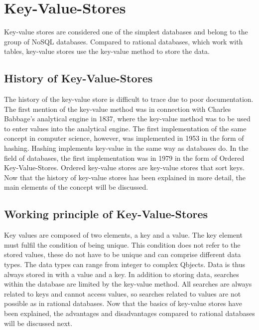 
\section{Key-Value-Stores}

Key-value stores are considered one of the simplest databases and belong to the group of NoSQL databases. 
Compared to rational databases, which work with tables, key-value stores use the key-value method to store the data. \parencite{Key_Value_Datastore_Hazelcast}


\subsection{History of Key-Value-Stores}

The history of the key-value store is difficult to trace due to poor documentation. 
The first mention of the key-value method was in connection with Charles Babbage's analytical engine in 1837, where the key-value method was to be used to enter values into the analytical engine. 
The first implementation of the same concept in computer science, however, was implemented in 1953 in the form of hashing. 
Hashing implements key-value in the same way as databases do. 
In the field of databases, the first implementation was in 1979 in the form of Ordered Key-Value-Stores. 
Ordered key-value stores are key-value stores that sort keys. 
Now that the history of key-value stores has been explained in more detail, the main elements of the concept will be discussed.\parencite{babge_table_cards, hash_table_history, ordered_key_value_history}

\subsection{Working principle of Key-Value-Stores}

Key values are composed of two elements, a key and a value. 
The key element must fulfil the condition of being unique. 
This condition does not refer to the stored values, these do not have to be unique and can comprise different data types. 
The data types can range from integer to complex Qbjects. 
Data is thus always stored in with a value and a key. 
In addition to storing data, searches within the database are limited by the key-value method. 
All searches are always related to keys and cannot access values, so searches related to values are not possible as in rational databases. 
Now that the basics of key-value stores have been explained, the advantages and disadvantages compared to rational databases will be discussed next. \parencite{Key_Value_Datastore_Hazelcast, Key_Value_Datastore}

